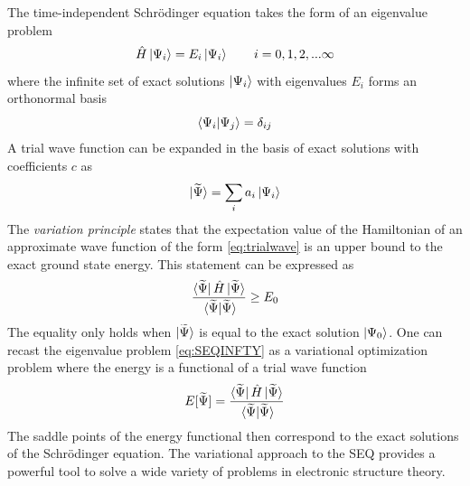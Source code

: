 The time-independent Schrödinger equation takes the form of an eigenvalue problem
\begin{equation}
\hat{H} \ket{\Psi_i} = E_i \ket{\Psi_i} \qquad i=0,1,2,...\infty
\label{eq:SEQINFTY}
\end{equation}
\noindent where the infinite set of exact solutions $\ket{\Psi_i}$ with eigenvalues $E_i$ forms an orthonormal basis
\begin{equation}
\bra{\Psi_i}\ket{\Psi_j} = \delta_{ij}
\end{equation} 
\noindent A trial wave function can be expanded in the basis of exact solutions with coefficients $c$ as
\begin{equation}
\ket{\smash{\widetilde{\Psi}}} = \sum_i a_i \ket{\Psi_i}
\label{eq:trialwave}
\end{equation}
\noindent The \emph{variation principle} states that the expectation value of the Hamiltonian of an approximate wave function of the form \ref{eq:trialwave} is an upper bound to the exact ground state energy. This statement can be expressed as
\begin{equation}
\frac{\bra{\tPsi}\hat{H}\ket{\tPsi}}{\vphantom{\widetilde{\Psi}} \bra{\tPsi}\ket{\tPsi}} \geq E_0
\end{equation}
\noindent The equality only holds when $\ket{\smash{\widetilde{\Psi}}}$ is equal to the exact solution $\ket{\Psi_0}$. One can recast the eigenvalue problem \ref{eq:SEQINFTY} as a variational optimization problem where the energy is a functional of a trial wave function
\begin{equation}
E[\tPsi] = \frac{\bra{\tPsi}\hat{H}\ket{\tPsi}}{\vphantom{\widetilde{\Psi}} \bra{\tPsi}\ket{\tPsi}}
\end{equation}
\noindent The saddle points of the energy functional then correspond to the exact solutions of the Schrödinger equation. The variational approach to the SEQ provides a powerful tool to solve a wide variety of problems in electronic structure theory.

